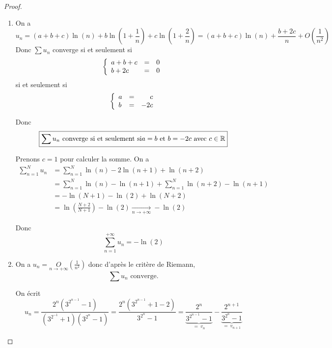 \begin{proof}
	\phantom{}
	\begin{enumerate}
		\item On a 
		\begin{equation}u_{n}=(a+b+c)\ln(n)+b\ln\left(1+\frac{1}{n}\right)+c\ln\left(1+\frac{2}{n}\right)=(a+b+c)\ln(n)+\frac{b+2c}{n}+O\left(\frac{1}{n^{2}}\right)\end{equation}
		Donc $\sum u_{n}$ converge si et seulement si 
		\begin{equation}
		\left\{
			\begin{array}[]{lcr}
				a+b+c &= &0\\
				b+2c &= &0
			\end{array}
		\right.
		\end{equation}
		si et seulement si 
		\begin{equation}
		\left\{
			\begin{array}[]{lcr}
				a &= &c\\
				b &= &-2c
			\end{array}
		\right.
		\end{equation}

		Donc 
		\begin{equation}\boxed{\sum u_{n}\text{ converge si et seulement si} a=b\text{ et }b=-2c\text{ avec }c\in\mathbb{R}}\end{equation}

		Prenons $c=1$ pour calculer la somme. On a 
		\begin{align}
			\sum_{n=1}^{N}u_{n}
			&=\sum_{n=1}^{N}\ln(n)-2\ln(n+1)+\ln(n+2)\\
			&=\sum_{n=1}^{N}\ln(n)-\ln(n+1)+\sum_{n=1}^{N}\ln(n+2)-\ln(n+1)\\
			&=-\ln(N+1)-\ln(2)+\ln(N+2)\\
			&=\ln\left(\frac{N+2}{N+1}\right)-\ln(2)\xrightarrow[n\to+\infty]{}-\ln(2)
		\end{align}

		Donc 
		\begin{equation}\boxed{\sum_{n=1}^{+\infty}u_{n}=-\ln(2)}\end{equation}

		\item On a $u_{n}=\underset{n\to+\infty}{O}\left(\frac{1}{n^{2}}\right)$ donc d'après le critère de Riemann,
		\begin{equation}\boxed{\sum u_{n}\text{ converge.}}\end{equation}

		On écrit 
		\begin{equation}u_{n}=\frac{2^{n}\left(3^{2^{n-1}}-1\right)}{\left(3^{2^{-1}}+1\right)\left(3^{2^{n}}-1\right)}=\frac{2^{n}\left(3^{2^{n-1}}+1-2\right)}{3^{2^{n}}-1}=\underbrace{\frac{2^{n}}{3^{2^{n-1}}-1}}_{=~v_{n}}-\underbrace{\frac{2^{n+1}}{3^{2^{n}}-1}}_{=~v_{n+1}}\end{equation}


\end{enumerate}
\end{proof}
